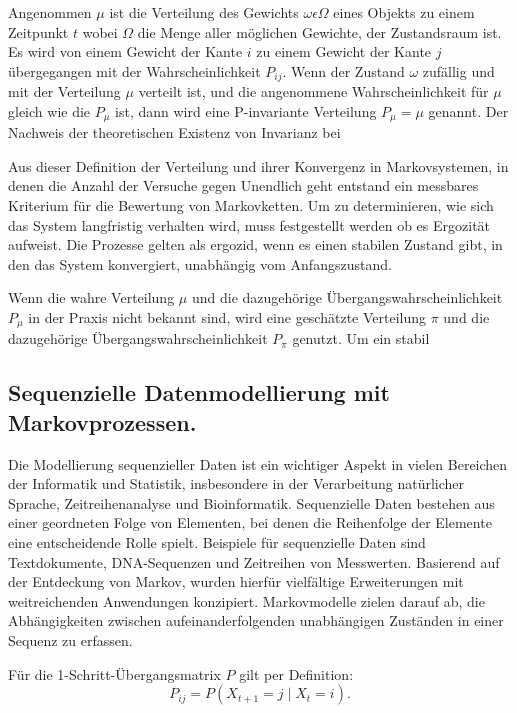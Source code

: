 Angenommen $\mu$ ist die Verteilung des Gewichts $\omega\epsilon\Omega$ eines Objekts zu einem Zeitpunkt $t$ wobei $\Omega$ die Menge aller möglichen Gewichte, der Zustandsraum ist. Es wird von einem Gewicht der Kante $i$ zu einem Gewicht der Kante $j$ übergegangen mit der Wahrscheinlichkeit $P_{ij}$.
Wenn der Zustand $\omega$ zufällig und mit der Verteilung $\mu$ verteilt ist, und die angenommene Wahrscheinlichkeit für $\mu$ gleich wie die $P_\mu$ ist, dann wird eine P-invariante Verteilung $P_\mu = \mu$ genannt. Der Nachweis der theoretischen Existenz von Invarianz bei  \citep{Lester1966}

Aus dieser Definition der Verteilung und ihrer Konvergenz in Markovsystemen, in denen die Anzahl der Versuche gegen Unendlich geht entstand ein messbares Kriterium für die Bewertung von Markovketten. Um zu determinieren, wie sich das System langfristig verhalten wird, muss festgestellt werden ob es Ergozität aufweist. Die Prozesse gelten als ergozid, wenn es einen stabilen Zustand gibt, in den das System konvergiert, unabhängig vom Anfangszustand. \cite{MeynTweedie1993}

Wenn die wahre Verteilung $\mu$ und die dazugehörige Übergangswahrscheinlichkeit $P_\mu$ in der Praxis nicht bekannt sind, wird eine geschätzte Verteilung $\pi$ und die dazugehörige Übergangswahrscheinlichkeit $P_\pi$ genutzt. Um ein stabil


\subsection{Sequenzielle Datenmodellierung mit Markovprozessen.}

Die Modellierung sequenzieller Daten ist ein wichtiger Aspekt in vielen Bereichen der Informatik und Statistik, insbesondere in der Verarbeitung natürlicher Sprache, Zeitreihenanalyse und Bioinformatik. Sequenzielle Daten bestehen aus einer geordneten Folge von Elementen, bei denen die Reihenfolge der Elemente eine entscheidende Rolle spielt. Beispiele für sequenzielle Daten sind Textdokumente, DNA-Sequenzen und Zeitreihen von Messwerten.
Basierend auf der Entdeckung von Markov, wurden hierfür vielfältige Erweiterungen mit weitreichenden Anwendungen konzipiert.
Markovmodelle zielen darauf ab, die Abhängigkeiten zwischen aufeinanderfolgenden unabhängigen Zuständen in einer Sequenz zu erfassen.

Für die 1-Schritt-Übergangsmatrix $P$ gilt per Definition:
\begin{equation}
P_{ij} = P(X_{t+1} = j \mid X_t = i).
\end{equation}

